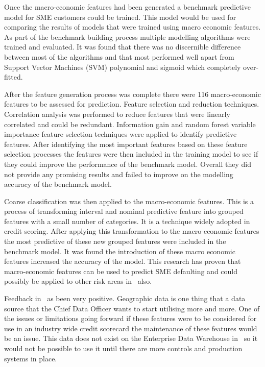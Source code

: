 Once the macro-economic features had been generated a benchmark  predictive model for SME customers could be trained. This model would be used for comparing the results of models that were trained using macro economic features. As part of the benchmark building process multiple modelling algorithms were trained and evaluated. It was found that there was no discernible difference between most of the algorithms and that most performed well apart from Support Vector Machines (SVM) polynomial and sigmoid which completely over-fitted.  

After the feature generation process was complete there were 116 macro-economic features to be assessed for prediction. Feature selection and reduction techniques. Correlation analysis was performed to reduce features that were linearly correlated and could be redundant. Information gain and random forest variable importance feature selection techniques were applied to identify predictive features. After identifying the most important features based on these feature selection processes the features were then included in the training model to see if they could improve the performance of the benchmark model. Overall they did not provide any promising results and failed to improve on the modelling accuracy of the benchmark model.

Coarse classification was then applied to the macro-economic features. This is a process of transforming interval and nominal predictive feature into grouped features with a small number of categories. It is a technique widely adopted in credit scoring. After applying this transformation to the macro-economic features the most predictive of these new grouped features were included in the benchmark model. It was found the introduction of these macro economic features increased the accuracy of the model. This research has proven that macro-economic features can be used to predict SME defaulting and could possibly be applied to other risk areas in \subjectname\ also.

Feedback in \subjectname\ as been very positive. Geographic data is one thing that a data source that the Chief Data Officer wants to start utilising more and more. One of the issues or limitations going forward if these features were to be considered for use in an industry wide credit scorecard the maintenance of these features would be an issue. This data does not exist on the Enterprise Data Warehouse in \subjectname\ so it would not be possible to use it until there are more controls and production systems in place. 



